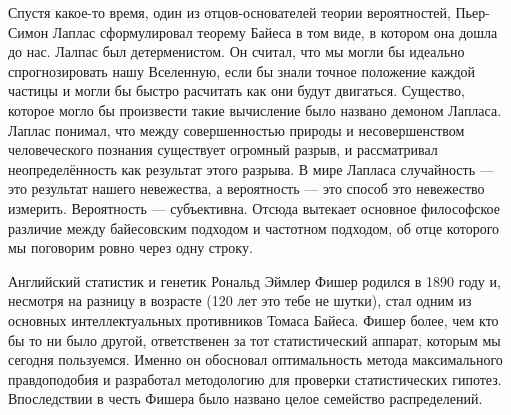 \documentclass[12pt, a4paper, oneside]{extreport}
\theoremstyle{plain}              %
\theoremstyle{definition}         %
\begin{document}
Спустя какое-то время, один из отцов-основателей теории вероятностей, Пьер-Симон Лаплас сформулировал теорему Байеса в том виде, в котором она дошла до нас.  Лалпас был детерменистом. Он считал, что мы могли бы идеально спрогнозировать нашу Вселенную, если бы знали точное положение каждой частицы и могли бы быстро расчитать как они будут двигаться.   Существо, которое могло бы произвести такие вычисление было названо демоном Лапласа. Лаплас понимал, что между совершенностью природы и несовершенством человеческого познания существует огромный разрыв, и рассматривал неопределённость как результат этого разрыва.  В мире Лапласа случайность --- это результат нашего невежества, а вероятность --- это способ это невежество измерить. Вероятность --- субъективна. Отсюда вытекает основное философское различие между байесовским подходом и частотном подходом, об отце которого мы поговорим ровно через одну строку.

Английский статистик и генетик Рональд Эймлер Фишер родился в 1890 году и, несмотря на разницу в возрасте (120 лет это тебе не шутки), стал одним из основных интеллектуальных противников Томаса Байеса. Фишер более, чем кто бы то ни было другой, ответственен за тот статистический аппарат, которым мы сегодня пользуемся. Именно он обосновал оптимальность метода максимального правдоподобия и разработал методологию для проверки статистических гипотез. Впоследствии в честь Фишера было названо целое семейство распределений. 
\end{document}
